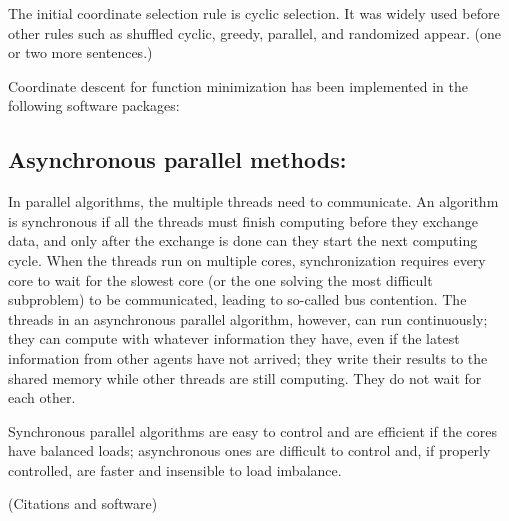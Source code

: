 The initial coordinate selection rule  is   cyclic selection. It was widely used before other rules such as shuffled cyclic, greedy, parallel, and randomized appear. (one or two more sentences.)

Coordinate descent for function minimization has been implemented in the following software packages: 

\subsection*{Asynchronous parallel methods:}  

In  parallel algorithms, the multiple threads need to communicate. An algorithm is synchronous if all the  threads must finish computing before they exchange data, and only after the exchange is done can they start the next computing cycle. When the threads run on multiple cores, synchronization requires every core to wait for the slowest core
(or the one solving the most difficult subproblem) to be communicated,  leading to so-called  bus contention. The threads in an asynchronous parallel algorithm, however, can run continuously; they can compute with whatever information they have, even if the latest information from other agents
have not arrived; they write their results to the shared memory while other threads are still computing. They do not wait for each other.

Synchronous parallel algorithms are easy to control and are efficient if the cores have balanced loads; asynchronous  ones are difficult to control and, if properly controlled, are faster and insensible to load imbalance.

(Citations and software)

